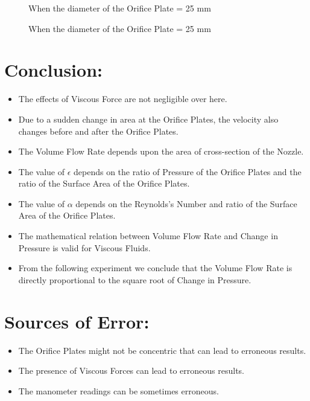 \documentclass[12pt,a4paper]{article}
\begin{document}
\clearpage
\begin{figure}[!ht]
	\begin{center}
	\end{center}
	\caption{When the diameter of the Orifice Plate = 25 mm}
\end{figure}
\begin{figure}[!ht]
	\begin{center}
	\end{center}
	\caption{When the diameter of the Orifice Plate = 25 mm}
\end{figure}
\section{Conclusion:}
\begin{itemize}
\item The effects of Viscous Force are not negligible over here.
\item Due to a sudden change in area at the Orifice Plates, the velocity also changes before and after the Orifice Plates.
\item The Volume Flow Rate depends upon the area of cross-section of the Nozzle.
\item The value of $\epsilon$ depends on the ratio of Pressure of the Orifice Plates and the ratio of the Surface Area of the Orifice Plates.
\item The value of $\alpha$ depends on the Reynolds's Number and ratio of the Surface Area of the Orifice Plates.
\item The mathematical relation between Volume Flow Rate and Change in Pressure is valid for Viscous Fluids.
\item From the following experiment we conclude that the Volume Flow Rate is directly proportional to the square root of Change in Pressure.
\end{itemize}
\section{Sources of Error:}
\begin{itemize}
\item The Orifice Plates might not be concentric that can lead to erroneous results.
\item The presence of Viscous Forces can lead to erroneous results.
\item The manometer readings can be sometimes erroneous.
\end{itemize}
\end{document}
